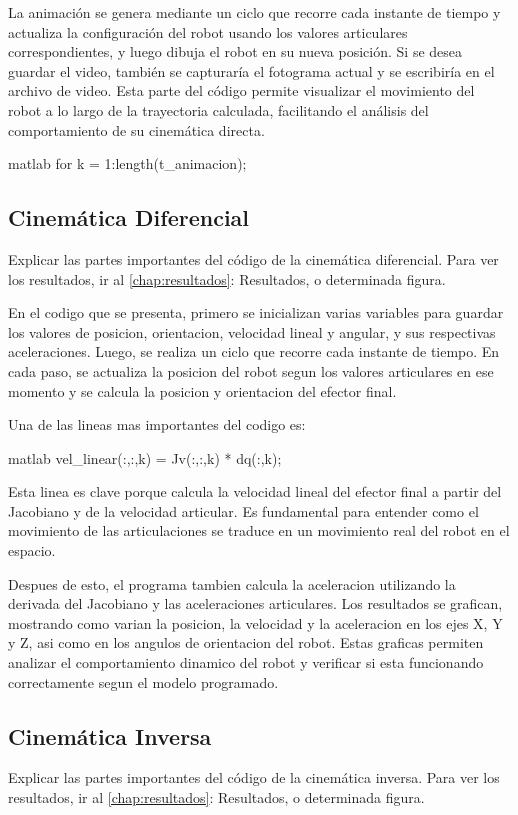 La animación se genera mediante un ciclo que recorre cada instante de tiempo y actualiza la configuración del robot usando los valores articulares correspondientes, y luego dibuja el robot en su nueva posición. Si se desea guardar el video, también se capturaría el fotograma actual y se escribiría en el archivo de video. Esta parte del código permite visualizar el movimiento del robot a lo largo de la trayectoria calculada, facilitando el análisis del comportamiento de su cinemática directa.

\begin{matlabcode}{matlab}
	for k = 1:length(t_animacion);
\end{matlabcode}


\subsection{Cinemática Diferencial}
Explicar las partes importantes del código de la cinemática diferencial.
Para ver los resultados, ir al \autoref{chap:resultados}: Resultados, o determinada figura.

En el codigo que se presenta, primero se inicializan varias variables para guardar los valores de posicion, orientacion, velocidad lineal y angular, y sus respectivas aceleraciones. Luego, se realiza un ciclo que recorre cada instante de tiempo. En cada paso, se actualiza la posicion del robot segun los valores articulares en ese momento y se calcula la posicion y orientacion del efector final.

Una de las lineas mas importantes del codigo es:
\begin{matlabcode}{matlab}
	vel_linear(:,:,k) = Jv(:,:,k) * dq(:,k);
\end{matlabcode}

Esta linea es clave porque calcula la velocidad lineal del efector final a partir del Jacobiano y de la velocidad articular. Es fundamental para entender como el movimiento de las articulaciones se traduce en un movimiento real del robot en el espacio.

Despues de esto, el programa tambien calcula la aceleracion utilizando la derivada del Jacobiano y las aceleraciones articulares. Los resultados se grafican, mostrando como varian la posicion, la velocidad y la aceleracion en los ejes X, Y y Z, asi como en los angulos de orientacion del robot. Estas graficas permiten analizar el comportamiento dinamico del robot y verificar si esta funcionando correctamente segun el modelo programado.

\subsection{Cinemática Inversa}
Explicar las partes importantes del código de la cinemática inversa.
Para ver los resultados, ir al \autoref{chap:resultados}: Resultados, o determinada figura.